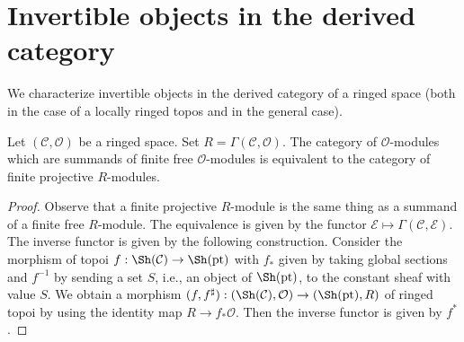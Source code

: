 \section{Invertible objects in the derived category}
\label{section-invertible-D-or-R}

\noindent
We characterize invertible objects in the derived category of
a ringed space (both in the case of a locally ringed topos and
in the general case).

\begin{lemma}
\label{lemma-category-summands-finite-free}
Let $(\mathcal{C}, \mathcal{O})$ be a ringed space.
Set $R = \Gamma(\mathcal{C}, \mathcal{O})$. The category of
$\mathcal{O}$-modules which are summands of finite free
$\mathcal{O}$-modules is equivalent to the category of
finite projective $R$-modules.
\end{lemma}

\begin{proof}
Observe that a finite projective $R$-module is the same thing
as a summand of a finite free $R$-module.
The equivalence is given by the functor $\mathcal{E} \mapsto
\Gamma(\mathcal{C}, \mathcal{E})$.
The inverse functor is given by the following construction.
Consider the morphism of topoi $f : \Sh(\mathcal{C}) \to \Sh(\text{pt})$
with $f_*$ given by taking global sections and
$f^{-1}$ by sending a set $S$, i.e., an object of
$\Sh(\text{pt})$, to the constant sheaf with value $S$.
We obtain a morphism
$(f, f^\sharp) : (\Sh(\mathcal{C}), \mathcal{O}) \to (\Sh(\text{pt}), R)$
of ringed topoi by using the identity map $R \to f_*\mathcal{O}$.
Then the inverse functor is given by $f^*$.
\end{proof}

